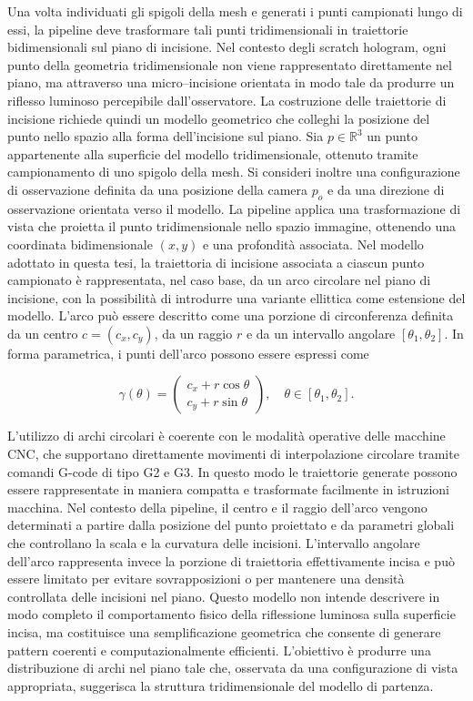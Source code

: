 \documentclass[a4paper,11pt,titlepage,twoside]{book}
\newcommand{\1}{\mathbf{1}}
\numberwithin{equation}{chapter}
\theoremstyle{plain}
\theoremstyle{definition}
\begin{document}
	Una volta individuati gli spigoli della mesh e generati i punti campionati lungo di essi, la pipeline deve trasformare tali punti tridimensionali in traiettorie bidimensionali sul piano di incisione. Nel contesto degli scratch hologram, ogni punto della geometria tridimensionale non viene rappresentato direttamente nel piano, ma attraverso una micro–incisione orientata in modo tale da produrre un riflesso luminoso percepibile dall’osservatore. La costruzione delle traiettorie di incisione richiede quindi un modello geometrico che colleghi la posizione del punto nello spazio alla forma dell’incisione sul piano.
	Sia \(p \in \mathbb{R}^3\) un punto appartenente alla superficie del modello tridimensionale, ottenuto tramite campionamento di uno spigolo della mesh. Si consideri inoltre una configurazione di osservazione definita da una posizione della camera \(p_o\) e da una direzione di osservazione orientata verso il modello. La pipeline applica una trasformazione di vista che proietta il punto tridimensionale nello spazio immagine, ottenendo una coordinata bidimensionale \((x, y)\) e una profondità associata.
	Nel modello adottato in questa tesi, la traiettoria di incisione associata a ciascun punto campionato è rappresentata, nel caso base, da un arco circolare nel piano di incisione, con la possibilità di introdurre una variante ellittica come estensione del modello. L’arco può essere descritto come una porzione di circonferenza definita da un centro \(c = (c_x, c_y)\), da un raggio \(r\) e da un intervallo angolare \([\theta_1, \theta_2]\). In forma parametrica, i punti dell’arco possono essere espressi come
	
	\[
	\gamma(\theta) =
	\begin{pmatrix}
		c_x + r \cos\theta \\
		c_y + r \sin\theta
	\end{pmatrix},
	\quad \theta \in [\theta_1, \theta_2].
	\]
	
	L’utilizzo di archi circolari è coerente con le modalità operative delle macchine CNC, che supportano direttamente movimenti di interpolazione circolare tramite comandi G-code di tipo G2 e G3. In questo modo le traiettorie generate possono essere rappresentate in maniera compatta e trasformate facilmente in istruzioni macchina.
	Nel contesto della pipeline, il centro e il raggio dell’arco vengono determinati a partire dalla posizione del punto proiettato e da parametri globali che controllano la scala e la curvatura delle incisioni. L’intervallo angolare dell’arco rappresenta invece la porzione di traiettoria effettivamente incisa e può essere limitato per evitare sovrapposizioni o per mantenere una densità controllata delle incisioni nel piano.
	Questo modello non intende descrivere in modo completo il comportamento fisico della riflessione luminosa sulla superficie incisa, ma costituisce una semplificazione geometrica che consente di generare pattern coerenti e computazionalmente efficienti. L’obiettivo è produrre una distribuzione di archi nel piano tale che, osservata da una configurazione di vista appropriata, suggerisca la struttura tridimensionale del modello di partenza.
	
\end{document}
